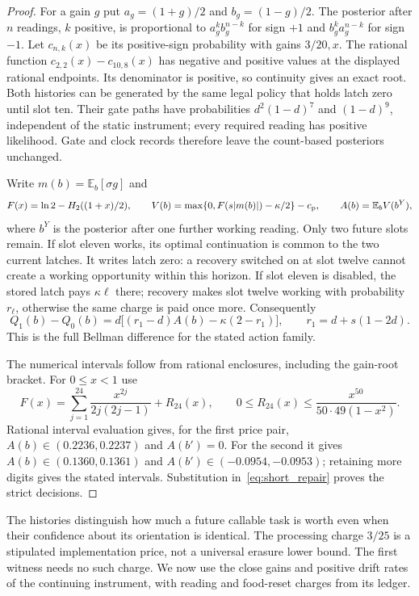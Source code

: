\documentclass[12pt]{article}
\theoremstyle{definition}
\newcommand{\E}{\mathbb E}
\begin{document}
\begin{proof}
For a gain $g$ put $a_g=(1+g)/2$ and $b_g=(1-g)/2$. The posterior after
$n$ readings, $k$ positive, is proportional to
$a_g^kb_g^{n-k}$ for sign $+1$ and $b_g^ka_g^{n-k}$ for sign $-1$.
Let $c_{n,k}(x)$ be its positive-sign probability with gains $3/20,x$.
The rational function $c_{2,2}(x)-c_{10,8}(x)$ has negative and positive
values at the displayed rational endpoints. Its denominator is positive,
so continuity gives an exact root. Both histories can be generated by the
same legal policy that holds latch zero until slot ten. Their gate paths
have probabilities $d^2(1-d)^7$ and $(1-d)^9$, independent of the static
instrument; every required reading has positive likelihood. Gate and
clock records therefore leave the count-based posteriors unchanged.

Write $m(b)=\E_b[\sigma g]$ and
\[
 F(x)=\ln2-H_2((1+x)/2),\qquad
 V(b)=\max\{0,F(s|m(b)|)-\kappa/2\}-c_{\rm p},\qquad
 A(b)=\E_b V(b^Y),
\]
where $b^Y$ is the posterior after one further working reading.
Only two future slots remain. If slot eleven works, its optimal
continuation is common to the two current latches. It writes latch zero:
a recovery switched on at slot twelve cannot create a working opportunity
within this horizon. If slot eleven is disabled, the stored latch pays
$\kappa\ell$ there; recovery makes slot twelve working with probability
$r_\ell$, otherwise the same charge is paid once more. Consequently
\begin{equation}\label{eq:short_repair}
 Q_1(b)-Q_0(b)
 =d\bigl[(r_1-d)A(b)-\kappa(2-r_1)\bigr],\qquad
 r_1=d+s(1-2d).
\end{equation}
This is the full Bellman difference for the stated action family.

The numerical intervals follow from rational enclosures, including the
gain-root bracket. For $0\le x<1$ use
\[
 F(x)=\sum_{j=1}^{24}\frac{x^{2j}}{2j(2j-1)}+R_{24}(x),\qquad
 0\le R_{24}(x)\le\frac{x^{50}}{50\cdot49(1-x^2)}.
\]
Rational interval evaluation gives, for the first price pair,
$A(b)\in(0.2236,0.2237)$ and $A(b')=0$.
For the second it gives $A(b)\in(0.1360,0.1361)$ and
$A(b')\in(-0.0954,-0.0953)$; retaining more digits gives the stated intervals.
Substitution in~\eqref{eq:short_repair} proves the strict decisions.
\end{proof}

The histories distinguish how much a future callable task is worth even
when their confidence about its orientation is identical. The processing
charge $3/25$ is a stipulated implementation price, not a universal
erasure lower bound. The first witness needs no such charge. We now use
the close gains and positive drift rates of the continuing instrument,
with reading and food-reset charges from its ledger.
\end{document}
